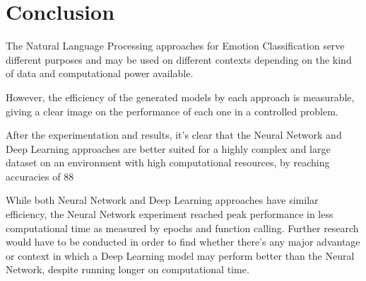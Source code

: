 \section{Conclusion}

The Natural Language Processing approaches for Emotion Classification serve different purposes and may be used on different contexts depending on the kind of data and computational power available.

However, the efficiency of the generated models by each approach is measurable, giving a clear image on the performance of each one in a controlled problem.

After the experimentation and results, it’s clear that the Neural Network and Deep Learning approaches are better suited for a highly complex and large dataset on an environment with high computational resources, by reaching accuracies of 88%

While both Neural Network and Deep Learning approaches have similar efficiency, the Neural Network experiment reached peak performance in less computational time as measured by epochs and function calling. Further research would have to be conducted in order to find whether there’s any major advantage or context in which a Deep Learning model may perform better than the Neural Network, despite running longer on computational time.